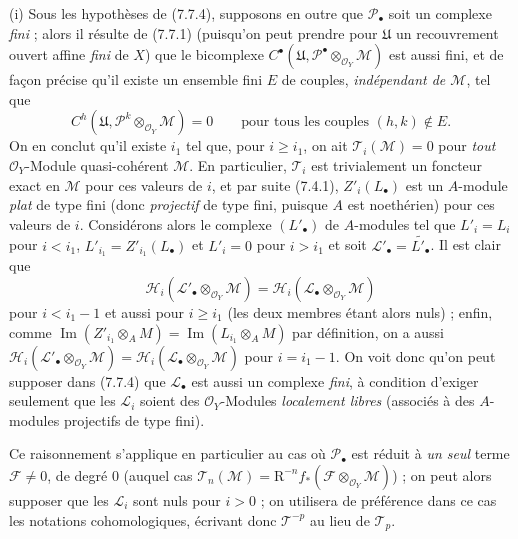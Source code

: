 \begin{remarks}[7.7.12]
\textnormal{(i)} Sous les hypothèses de (7.7.4), supposons en outre que
$\mathscr P_\bullet$ soit un complexe \emph{fini} ; alors il résulte de (7.7.1)
(puisqu'on peut prendre pour $\mathfrak U$ un recouvrement ouvert affine
\emph{fini} de $X$) que le bicomplexe
$C^\bullet(\mathfrak U,\mathscr P^\bullet\otimes_{\mathscr O_Y}\mathscr M)$ est
aussi fini, et de façon précise qu'il existe un ensemble fini $E$ de couples,
\emph{indépendant de $\mathscr M$}, tel que
\[
  C^h(\mathfrak U,\mathscr P^k\otimes_{\mathscr O_Y}\mathscr M)=0
  \qquad\text{pour tous les couples }(h,k)\notin E.
\]
On en conclut qu'il existe $i_1$ tel que, pour $i\geq i_1$, on ait
$\mathscr T_i(\mathscr M)=0$ pour \emph{tout} $\mathscr O_Y$-Module
quasi-cohérent $\mathscr M$. En particulier, $\mathscr T_i$ est trivialement un
foncteur exact en $\mathscr M$ pour ces valeurs de $i$, et par suite (7.4.1),
$Z'_i(L_\bullet)$ est un $A$-module \emph{plat} de type fini (donc
\emph{projectif} de type fini, puisque $A$ est noethérien) pour ces valeurs de
$i$. Considérons alors le complexe $(L'_\bullet)$ de $A$-modules tel que
$L'_i=L_i$ pour $i<i_1$, $L'_{i_1}=Z'_{i_1}(L_\bullet)$ et $L'_i=0$ pour
$i>i_1$ et soit $\mathscr L'_\bullet=\widetilde{L'_\bullet}$. Il est clair que
\[
  \mathscr H_i(\mathscr L'_\bullet\otimes_{\mathscr O_Y}\mathscr M)
  =
  \mathscr H_i(\mathscr L_\bullet\otimes_{\mathscr O_Y}\mathscr M)
\]
pour $i<i_1-1$ et aussi pour $i\geq i_1$ (les deux membres étant alors nuls) ;
enfin, comme
$\operatorname{Im}(Z'_{i_1}\otimes_A M)=\operatorname{Im}(L_{i_1}\otimes_A M)$
par définition, on a aussi
$\mathscr H_i(\mathscr L'_\bullet\otimes_{\mathscr O_Y}\mathscr M)
=\mathscr H_i(\mathscr L_\bullet\otimes_{\mathscr O_Y}\mathscr M)$ pour
$i=i_1-1$. On voit donc qu'on peut supposer dans (7.7.4) que
$\mathscr L_\bullet$ est aussi un complexe \emph{fini}, à condition d'exiger
seulement que les $\mathscr L_i$ soient des $\mathscr O_Y$-Modules
\emph{localement libres} (associés à des $A$-modules projectifs de type fini).

Ce raisonnement s'applique en particulier au cas où $\mathscr P_\bullet$ est
réduit à \emph{un seul} terme $\mathscr F\ne0$, de degré 0 (auquel cas
$\mathscr T_n(\mathscr M)=\mathrm R^{-n}f_*
(\mathscr F\otimes_{\mathscr O_Y}\mathscr M)$) ; on peut alors supposer que les
$\mathscr L_i$ sont nuls pour $i>0$ ; on utilisera de préférence dans ce cas les
notations cohomologiques, écrivant donc $\mathscr T^{-p}$ au lieu de
$\mathscr T_p$.


\end{remarks}
